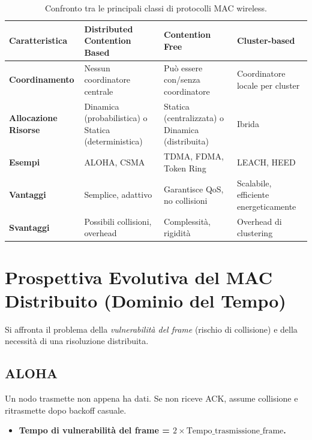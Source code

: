 \begin{table}[H]
\centering
\begin{tabular}{|p{3cm}|p{3cm}|p{3cm}|p{3cm}|}
\hline
\rowcolor{bg_custom} \textbf{Caratteristica} & \textbf{Distributed Contention Based} & \textbf{Contention Free} & \textbf{Cluster-based} \\
\hline
\textbf{Coordinamento} & Nessun coordinatore centrale & Può essere con/senza coordinatore & Coordinatore locale per cluster \\
\hline
\textbf{Allocazione Risorse} & Dinamica (probabilistica) o Statica (deterministica) & Statica (centralizzata) o Dinamica (distribuita) & Ibrida \\
\hline
\textbf{Esempi} & ALOHA, CSMA & TDMA, FDMA, Token Ring & LEACH, HEED \\
\hline
\textbf{Vantaggi} & Semplice, adattivo & Garantisce QoS, no collisioni & Scalabile, efficiente energeticamente \\
\hline
\textbf{Svantaggi} & Possibili collisioni, overhead & Complessità, rigidità & Overhead di clustering \\
\hline
\end{tabular}
\caption{Confronto tra le principali classi di protocolli MAC wireless.}
\label{tab:mac_comparison}
\end{table}

\section{Prospettiva Evolutiva del MAC Distribuito (Dominio del Tempo)}
Si affronta il problema della \textit{vulnerabilità del frame} (rischio di collisione) e della necessità di una risoluzione distribuita.

\subsection{ALOHA}
Un nodo trasmette non appena ha dati. Se non riceve ACK, assume collisione e ritrasmette dopo backoff casuale.
\begin{itemize}
    \item \textbf{Tempo di vulnerabilità del frame = $2 \times \text{Tempo\_trasmissione\_frame}$.}
\end{itemize}

